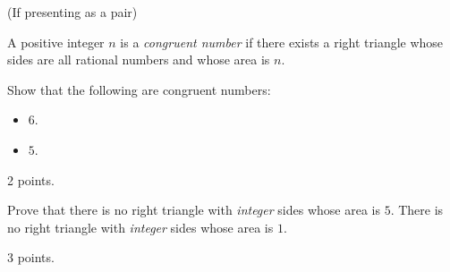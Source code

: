 \documentclass[letterpaper, 11 pt, instructornotes]{ximera}
\begin{document}
\begin{exploration}(If presenting as a pair)
 \begin{definition}
 A positive integer $n$ is a \emph{congruent number} if there exists a right triangle whose sides are all rational numbers and whose area is $n$. 
\end{definition}

\begin{problem}
Show that the following are congruent numbers:
\begin{itemize}
 \item $6$.
 \item $5$.
\end{itemize} 
\begin{rubric}
 2 points.
\end{rubric}
\end{problem}

\begin{problem}
Prove that there is no right triangle with \emph{integer} sides whose area is $5$.
 There is no right triangle with \emph{integer} sides whose area is $1$.
 \begin{rubric}
 3 points.
\end{rubric}
\end{problem}

\end{exploration}
\end{document}
